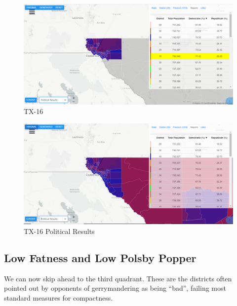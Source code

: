 \documentclass[letterpaper]{article}
\begin{document}
\begin{figure}[H]
	\includegraphics[width=\linewidth]{./figures/TX-16.png}
	\caption{TX-16}
	\label{fig:tx16border}
\end{figure}

\begin{figure}[H]
	\includegraphics[width=\linewidth]{./figures/TX-16-SurroundingArea.png}
	\caption{TX-16 Political Results}
	\label{fig:tx16political}
\end{figure}

\subsection{Low Fatness and Low Polsby Popper}
We can now skip ahead to the third quadrant. These are the districts often pointed out by opponents of gerrymandering as being “bad”, failing most standard measures for compactness.
\end{document}
